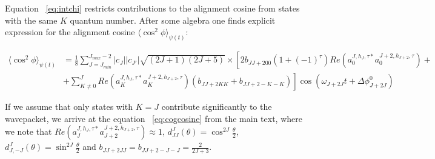 \documentclass[a4paper,american,floatfix,pdftex,superscriptaddress,twoside,%
aps,pra,
linenumbers,%
reprint,%
]{revtex4-2}%
\begin{document}
Equation ~\eqref{eq:intchi} restricts contributions to the alignment cosine from states with the same $K$ quantum number. After 
some algebra one finds explicit expression for the alignment cosine $\langle \cos^2 \phi \rangle_{\psi(t)} $:
\begin{widetext}
	\[
	\begin{split}
	\langle \cos^2 \phi \rangle_{\psi(t)}  &=  \frac{1}{8} \sum_{J =J_{min}}^{J_{max}-2} |c_J| |c_{J'}| \sqrt{(2J+1)(2J+5)}\times 
\left[2 b_{JJ+200}(1+(-1)^{\tau})Re( a^{J,h_J,\tau*}_0 a^{J+2,h_{J+2},\tau}_0)+\right. \\
&\left.+ \sum_{K\neq 0}^{J} Re( a^{J,h_J,\tau*}_K 
a^{J+2,h_{J+2},\tau}_K)(b_{JJ+2KK} + b_{JJ+2-K-K})
	\right] \cos(\omega_{J+2J}t + \Delta \phi^0_{J+2J})
	\end{split}
	\]
\end{widetext}
If we assume that only states with $K=J$ contribute significantly to the wavepacket, we arrive at the equation 
~\eqref{eq:cogcosine} from the main text, where we note that $Re( a^{J,h_J,\tau*}_J
a^{J+2,h_{J+2},\tau}_{J+2}) \approx 1$,  $d^J_{JJ}(\theta) = \cos^{2J}\frac{\theta}{2}$, $d^J_{J,-J}(\theta) = 
\sin^{2J}\frac{\theta}{2}$ and $b_{JJ+2JJ} =  b_{JJ+2-J-J} = \frac{2}{2J+3}$. 


\end{document}
